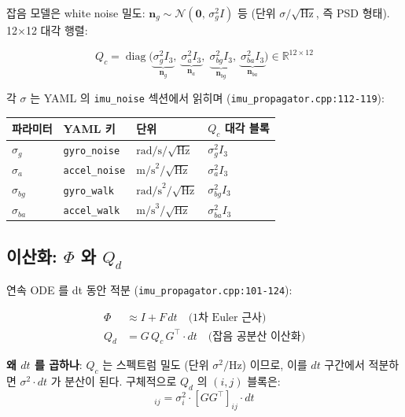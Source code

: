 \documentclass[11pt,a4paper,oneside]{report}
\newcommand{\R}{\mathbb{R}}
\newcommand{\T}{^{\!\top}}
\DeclareMathOperator{\diag}{diag}
\begin{document}
잡음 모델은 white noise 밀도: \(\bm{n}_g \sim \mathcal{N}(\bm{0},\,\sigma_g^2 I)\) 등 (단위 \(\sigma/\sqrt{\text{Hz}}\), 즉 PSD 형태). 12$\times$12 대각 행렬:

\begin{equation}
Q_c = \diag\!\bigl(\underbrace{\sigma_g^2 I_3}_{\bm{n}_g},\;
                   \underbrace{\sigma_a^2 I_3}_{\bm{n}_a},\;
                   \underbrace{\sigma_{bg}^2 I_3}_{\bm{n}_{bg}},\;
                   \underbrace{\sigma_{ba}^2 I_3}_{\bm{n}_{ba}}\bigr)
     \in \R^{12\times 12}
\end{equation}

각 \(\sigma\) 는 YAML 의 \texttt{imu\_noise} 섹션에서 읽히며 (\texttt{imu\_propagator.cpp:112-119}):

\begin{center}\small
\begin{tabular}{llll}
\toprule
파라미터 & YAML 키 & 단위 & \(Q_c\) 대각 블록 \\
\midrule
\(\sigma_g\)  & \texttt{gyro\_noise}  & \(\text{rad/s}/\sqrt{\text{Hz}}\) & \(\sigma_g^2 I_3\)  \\
\(\sigma_a\)  & \texttt{accel\_noise} & \(\text{m/s}^2/\sqrt{\text{Hz}}\) & \(\sigma_a^2 I_3\)  \\
\(\sigma_{bg}\) & \texttt{gyro\_walk}  & \(\text{rad/s}^2/\sqrt{\text{Hz}}\) & \(\sigma_{bg}^2 I_3\) \\
\(\sigma_{ba}\) & \texttt{accel\_walk} & \(\text{m/s}^3/\sqrt{\text{Hz}}\) & \(\sigma_{ba}^2 I_3\) \\
\bottomrule
\end{tabular}
\end{center}

\subsection{이산화: \(\Phi\) 와 \(Q_d\)}

연속 ODE 를 dt 동안 적분 (\texttt{imu\_propagator.cpp:101-124}):

\begin{align}
\Phi &\approx I + F \, dt \quad \text{(1차 Euler 근사)} \\
Q_d &= G \, Q_c \, G\T \cdot dt \quad \text{(잡음 공분산 이산화)}
\end{align}

\textbf{왜 \(dt\) 를 곱하나}: \(Q_c\) 는 스펙트럼 밀도 (단위 \(\sigma^2/\text{Hz}\)) 이므로, 이를 \(dt\) 구간에서 적분하면 \(\sigma^2 \cdot dt\) 가 분산이 된다. 구체적으로 \(Q_d\) 의 \((i,j)\) 블록은:
\begin{equation}
[Q_d]_{ij} = \sigma_i^2 \cdot [G G\T]_{ij} \cdot dt
\end{equation}
\end{document}
